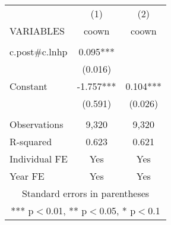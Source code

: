 \begin{tabular}{lcc} \hline
 & (1) & (2) \\
VARIABLES & coown & coown \\ \hline
 &  &  \\
c.post\#c.lnhp & 0.095*** &  \\
 & (0.016) &  \\
Constant & -1.757*** & 0.104*** \\
 & (0.591) & (0.026) \\
 &  &  \\
Observations & 9,320 & 9,320 \\
R-squared & 0.623 & 0.621 \\
Individual FE & Yes & Yes \\
 Year FE & Yes & Yes \\ \hline
\multicolumn{3}{c}{ Standard errors in parentheses} \\
\multicolumn{3}{c}{ *** p$<$0.01, ** p$<$0.05, * p$<$0.1} \\
\end{tabular}
